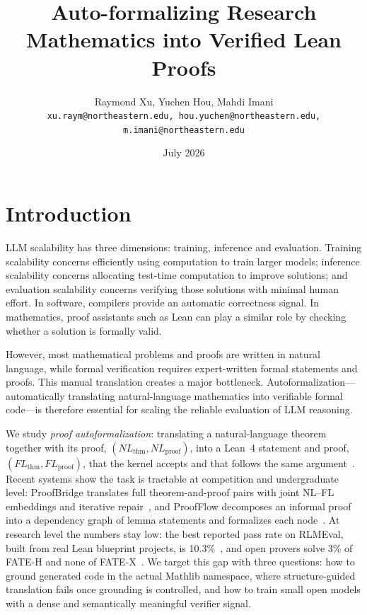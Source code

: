 \documentclass[sigconf,anonymous]{aamas}
\title{Auto-formalizing Research Mathematics into Verified Lean Proofs}
\author{Raymond Xu, Yuchen Hou, Mahdi Imani\\
  {\small \texttt{xu.raym@northeastern.edu, hou.yuchen@northeastern.edu, m.imani@northeastern.edu}}}
\date{July 2026}
\begin{document}
\maketitle

\section{Introduction}
LLM scalability has three dimensions:  training, inference and evaluation. Training scalability concerns efficiently using computation to train larger models; inference scalability concerns allocating test-time computation to improve solutions; and evaluation scalability concerns verifying those solutions with minimal human effort. In software, compilers provide an automatic correctness signal. In mathematics, proof assistants such as Lean can play a similar role by checking whether a solution is formally valid.

However, most mathematical problems and proofs are written in natural language, while formal verification requires expert-written formal statements and proofs. This manual translation creates a major bottleneck. Autoformalization—automatically translating natural-language mathematics into verifiable formal code—is therefore essential for scaling the reliable evaluation of LLM reasoning.

We study \emph{proof autoformalization}: translating a natural-language theorem
together with its proof, $(NL_{\text{thm}}, NL_{\text{proof}})$, into a Lean~4
statement and proof, $(FL_{\text{thm}}, FL_{\text{proof}})$, that the kernel
accepts and that follows the same argument~\citep{lean4}. Recent systems show
the task is tractable at competition and undergraduate level: ProofBridge
translates full theorem-and-proof pairs with joint NL--FL embeddings and
iterative repair~\citep{proofbridge2025}, and ProofFlow decomposes an informal
proof into a dependency graph of lemma statements and formalizes each
node~\citep{proofflow2025}. At research level the numbers stay low: the best
reported pass rate on RLMEval, built from real Lean blueprint projects, is
10.3\%~\citep{rlmeval2025}, and open provers solve 3\% of FATE-H and none of
FATE-X~\citep{fate2025}. We target this gap with three questions: how to ground
generated code in the actual Mathlib namespace, where structure-guided
translation fails once grounding is controlled, and how to train small open
models with a dense and semantically meaningful verifier signal.
\end{document}
